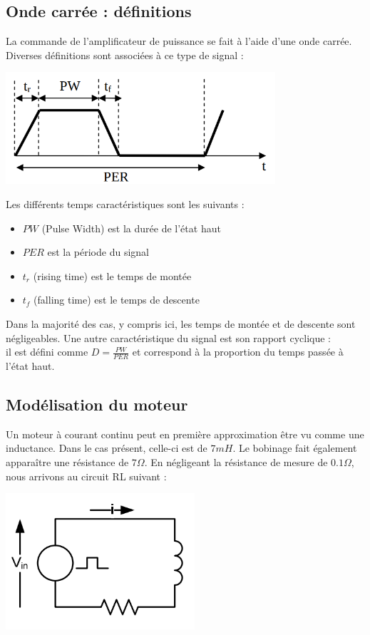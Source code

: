 \documentclass{../template/labo}
\begin{document}
\subsection{Onde carrée : définitions}
La commande de l'amplificateur de puissance se fait à l'aide d'une onde carrée. Diverses
définitions sont associées à ce type de signal :

\begin{center}
\includegraphics[width=10cm]{sch2}
\end{center}

Les différents temps caractéristiques sont les suivants :

\begin{itemize}
\item $PW$ (Pulse Width) est la durée de l'état haut
\item $PER$ est la période du signal
\item $t_r$ (rising time) est le temps de montée
\item $t_f$ (falling time) est le temps de descente
\end{itemize}

Dans la majorité des cas, y compris ici, les temps de montée et de descente sont négligeables.
Une autre caractéristique du signal est son rapport cyclique :\\

il est défini comme $D = \frac{PW}{PER}$ et correspond à la proportion du temps passée à l'état haut.

\subsection{Modélisation du moteur}

Un moteur à courant continu peut en première approximation être vu comme une inductance. Dans
le cas présent, celle-ci est de $7mH$. Le bobinage fait également apparaître une résistance de
$7\Omega$.
En négligeant la résistance de mesure de $0.1\Omega$, nous arrivons au circuit RL suivant :

\begin{center}
\includegraphics[width=7cm]{sch3}
\end{center}
\end{document}

